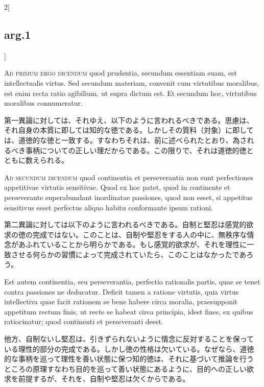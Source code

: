 \documentclass[paper=a4paper,fontsize=10pt,jafontsize=9pt,titlepage]{jlreq}
\begin{document}
\begin{paracol}{2}[\subsection{arg.1}]
\switchcolumn*[\subsection{ad.1}]

{\scshape Ad primum ergo dicendum} quod prudentia, secundum essentiam
suam, est intellectualis virtus. Sed secundum materiam, convenit cum
virtutibus moralibus, est enim recta ratio agibilium, ut supra dictum
est. Et secundum hoc, virtutibus moralibus connumeratur.

\switchcolumn

第一異論に対しては、それゆえ、以下のように言われるべきである。思慮は、
それ自身の本質に即しては知的な徳である。しかしその質料（対象）に即して
は、道徳的な徳と一致する。すなわちそれは、前に述べられたとおり、為され
るべき事柄についての正しい理だからである。この限りで、それは道徳的徳と
ともに数えられる。

\switchcolumn*[\subsection{ad.2}]

{\scshape Ad secundum dicendum} quod continentia et perseverantia non
sunt perfectiones appetitivae virtutis sensitivae. Quod ex hoc patet,
quod in continente et perseverante superabundant inordinatae
passiones, quod non esset, si appetitus sensitivus esset perfectus
aliquo habitu conformante ipsum rationi.

\switchcolumn

第二異論に対しては以下のように言われるべきである。自制と堅忍は感覚的欲
求の徳の完成ではない。このことは、自制や堅忍をする人の中に、無秩序な情
念があふれていることから明らかである。もし感覚的欲求が、それを理性に一
致させる何らかの習慣によって完成されていたら、このことはなかったであろ
う。

\switchcolumn*

Est autem continentia, seu perseverantia, perfectio rationalis partis,
quae se tenet contra passiones ne deducatur. Deficit tamen a ratione
virtutis, quia virtus intellectiva quae facit rationem se bene habere
circa moralia, praesupponit appetitum rectum finis, ut recte se habeat
circa principia, idest fines, ex quibus ratiocinatur; quod continenti
et perseveranti deest.

\switchcolumn

他方、自制ないし堅忍は、引きずられないように情念に反対することを保って
いる理性的部分の完成である。しかし徳の性格は欠いている。なぜなら、道徳
的な事柄を巡って理性を善い状態に保つ知的徳は、それに基づいて推論を行う
ところの原理すなわち目的を巡って善い状態にあるように、目的への正しい欲
求を前提するが、それを、自制や堅忍は欠くからである。


\end{paracol}
\end{document}
